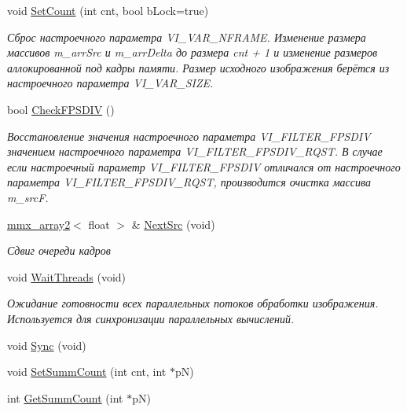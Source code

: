 \begin{DoxyCompactItemize}
void \hyperlink{class_c_v_i_engine_base_a042d710f3a5be21538478ad157680828}{Set\+Count} (int cnt, bool b\+Lock=true)
\begin{DoxyCompactList}\small\item\em Сброс настроечного параметра V\+I\+\_\+\+V\+A\+R\+\_\+\+N\+F\+R\+A\+M\+E. Изменение размера массивов m\+\_\+arr\+Src и m\+\_\+arr\+Delta до размера cnt + 1 и изменение размеров аллокированной под кадры памяти. Размер исходного изображения берётся из настроечного параметра V\+I\+\_\+\+V\+A\+R\+\_\+\+S\+I\+Z\+E. \end{DoxyCompactList}\item 
bool \hyperlink{class_c_v_i_engine_base_a4764b56d4269ed5cd101dddf545e039d}{Check\+F\+P\+S\+D\+I\+V} ()
\begin{DoxyCompactList}\small\item\em Восстановление значения настроечного параметра V\+I\+\_\+\+F\+I\+L\+T\+E\+R\+\_\+\+F\+P\+S\+D\+I\+V значением настроечного параметра V\+I\+\_\+\+F\+I\+L\+T\+E\+R\+\_\+\+F\+P\+S\+D\+I\+V\+\_\+\+R\+Q\+S\+T. В случае если настроечный параметр V\+I\+\_\+\+F\+I\+L\+T\+E\+R\+\_\+\+F\+P\+S\+D\+I\+V отличался от настроечного параметра V\+I\+\_\+\+F\+I\+L\+T\+E\+R\+\_\+\+F\+P\+S\+D\+I\+V\+\_\+\+R\+Q\+S\+T, производится очистка массива m\+\_\+src\+F. \end{DoxyCompactList}\item 
\hyperlink{classmmx__array2}{mmx\+\_\+array2}$<$ float $>$ \& \hyperlink{class_c_v_i_engine_base_aa1aa2604f40dd77bc49ca6ff8fd81535}{Next\+Src} (void)
\begin{DoxyCompactList}\small\item\em Сдвиг очереди кадров \end{DoxyCompactList}\item 
void \hyperlink{class_c_v_i_engine_base_a305c1b2285ddfcdbb021597f0b3dbd39}{Wait\+Threads} (void)
\begin{DoxyCompactList}\small\item\em Ожидание готовности всех параллельных потоков обработки изображения. Используется для синхронизации параллельных вычислений. \end{DoxyCompactList}\item 
void \hyperlink{class_c_v_i_engine_base_af12866653055639e69a61224615af7fe}{Sync} (void)
\item 
void \hyperlink{class_c_v_i_engine_base_a4b6c77fcb50dcb01f299d7e0f4b05ea6}{Set\+Summ\+Count} (int cnt, int $\ast$p\+N)
\item 
int \hyperlink{class_c_v_i_engine_base_adb6193dca9e4f6c71ad6e77df88bc9f7}{Get\+Summ\+Count} (int $\ast$p\+N)

\end{DoxyCompactItemize}

